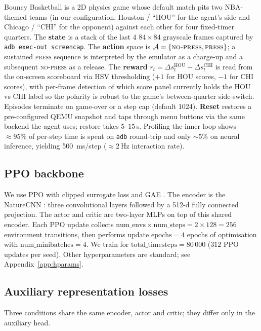 \documentclass{article}
\begin{document}
Bouncy Basketball is a 2D physics game whose default match pits two
NBA-themed teams (in our configuration, Houston / ``HOU'' for the
agent's side and Chicago / ``CHI'' for the opponent) against each
other for four
fixed-timer quarters. The \textbf{state} is a stack of the last
$4$ $84\times84$ grayscale frames captured by \texttt{adb exec-out
screencap}. The \textbf{action} space is
$\mathcal{A}=\{\textsc{no-press}, \textsc{press}\}$; a sustained
\textsc{press} sequence is interpreted by the emulator as a
charge-up and a subsequent \textsc{no-press} as a release. The
\textbf{reward}
$r_t = \Delta s^{\text{HOU}}_t - \Delta s^{\text{CHI}}_t$ is read
from the on-screen scoreboard via HSV thresholding ($+1$ for HOU
scores, $-1$ for CHI scores), with per-frame detection of which
score panel currently holds the HOU vs CHI label so the polarity
is robust to the game's between-quarter side-switch. Episodes
terminate on game-over or a step cap (default $1024$).
\textbf{Reset} restores a pre-configured QEMU snapshot and taps
through menu buttons via the same backend the agent uses; restore
takes $5$--$15$\,s. Profiling the inner loop shows
$\approx 95\%$ of per-step time is spent on \texttt{adb}
round-trip and only $\sim$$5\%$ on neural inference, yielding
\SI{500}{\milli\second}/step ($\approx \SI{2}{\hertz}$
interaction rate).

\subsection{PPO backbone}
\label{sec:ppo}

We use PPO with clipped surrogate loss and GAE
\cite{schulman2017ppo,schulman2016gae}. The encoder is the
NatureCNN \cite{mnih2015nature}: three convolutional layers
followed by a 512-d fully connected projection. The actor and
critic are two-layer MLPs on top of this shared encoder. Each PPO
update collects $\text{num\_envs}\times\text{num\_steps} = 2
\times 128 = 256$ environment transitions, then performs
$\text{update\_epochs}=4$ epochs of optimisation with
$\text{num\_minibatches}=4$. We train for
$\text{total\_timesteps}=80\,000$ ($312$ PPO updates per seed).
Other hyperparameters are standard; see Appendix~\ref{app:hparams}.

\subsection{Auxiliary representation losses}
\label{sec:aux}

Three conditions share the same encoder, actor and critic; they
differ only in the auxiliary head.
\end{document}
